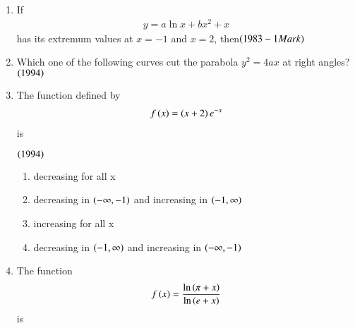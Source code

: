 \documentclass[journal,12pt,twocolumn]{IEEEtran}
\theoremstyle{remark}
\begin{document}
\begin{enumerate}
	\item If \begin{align*}y=a\ln x + bx^2 +x\end{align*} has its extremum values at 
$x = -1$ and $x = 2$, then\hfill$\left(1983 - 1 Mark\right)$

\begin{enumerate}
\end{enumerate}

        \item Which one of the following curves cut the parabola
$y^2 = 4ax$ at right angles?\hfill$\left(1994\right)$

\begin{enumerate}
\end{enumerate}

	\item The function defined by 
\begin{align*}f\left(x\right) = \left(x+2\right)e^{-x}\end{align*} is

		\hfill$\left(1994\right)$

\begin{enumerate}
	\item decreasing for all x
	\item decreasing in $\left(-\infty, -1\right)$ and increasing
		in $\left(-1, \infty\right)$
        \item increasing for all x
	\item decreasing in $\left(-1, \infty\right)$ and increasing
		in $\left(-\infty, -1\right)$\\
\end{enumerate}

	\item The function \begin{align*}f\left(x\right) =
	\frac{\ln \left(\pi + x\right)}{\ln \left(e + x\right)}\end{align*} is


\end{enumerate}
\end{document}
